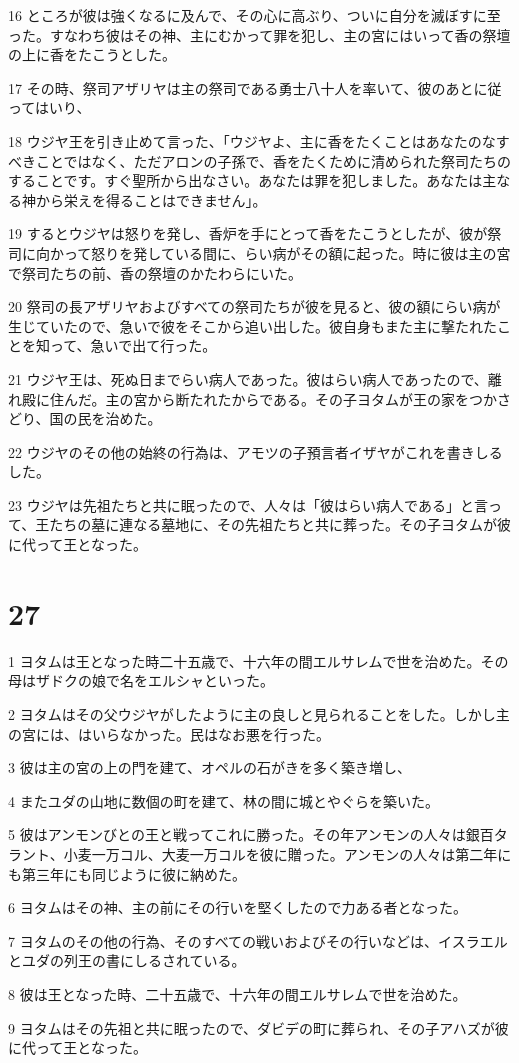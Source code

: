 \par 16 ところが彼は強くなるに及んで、その心に高ぶり、ついに自分を滅ぼすに至った。すなわち彼はその神、主にむかって罪を犯し、主の宮にはいって香の祭壇の上に香をたこうとした。
\par 17 その時、祭司アザリヤは主の祭司である勇士八十人を率いて、彼のあとに従ってはいり、
\par 18 ウジヤ王を引き止めて言った、「ウジヤよ、主に香をたくことはあなたのなすべきことではなく、ただアロンの子孫で、香をたくために清められた祭司たちのすることです。すぐ聖所から出なさい。あなたは罪を犯しました。あなたは主なる神から栄えを得ることはできません」。
\par 19 するとウジヤは怒りを発し、香炉を手にとって香をたこうとしたが、彼が祭司に向かって怒りを発している間に、らい病がその額に起った。時に彼は主の宮で祭司たちの前、香の祭壇のかたわらにいた。
\par 20 祭司の長アザリヤおよびすべての祭司たちが彼を見ると、彼の額にらい病が生じていたので、急いで彼をそこから追い出した。彼自身もまた主に撃たれたことを知って、急いで出て行った。
\par 21 ウジヤ王は、死ぬ日までらい病人であった。彼はらい病人であったので、離れ殿に住んだ。主の宮から断たれたからである。その子ヨタムが王の家をつかさどり、国の民を治めた。
\par 22 ウジヤのその他の始終の行為は、アモツの子預言者イザヤがこれを書きしるした。
\par 23 ウジヤは先祖たちと共に眠ったので、人々は「彼はらい病人である」と言って、王たちの墓に連なる墓地に、その先祖たちと共に葬った。その子ヨタムが彼に代って王となった。

\chapter{27}

\par 1 ヨタムは王となった時二十五歳で、十六年の間エルサレムで世を治めた。その母はザドクの娘で名をエルシャといった。
\par 2 ヨタムはその父ウジヤがしたように主の良しと見られることをした。しかし主の宮には、はいらなかった。民はなお悪を行った。
\par 3 彼は主の宮の上の門を建て、オペルの石がきを多く築き増し、
\par 4 またユダの山地に数個の町を建て、林の間に城とやぐらを築いた。
\par 5 彼はアンモンびとの王と戦ってこれに勝った。その年アンモンの人々は銀百タラント、小麦一万コル、大麦一万コルを彼に贈った。アンモンの人々は第二年にも第三年にも同じように彼に納めた。
\par 6 ヨタムはその神、主の前にその行いを堅くしたので力ある者となった。
\par 7 ヨタムのその他の行為、そのすべての戦いおよびその行いなどは、イスラエルとユダの列王の書にしるされている。
\par 8 彼は王となった時、二十五歳で、十六年の間エルサレムで世を治めた。
\par 9 ヨタムはその先祖と共に眠ったので、ダビデの町に葬られ、その子アハズが彼に代って王となった。


